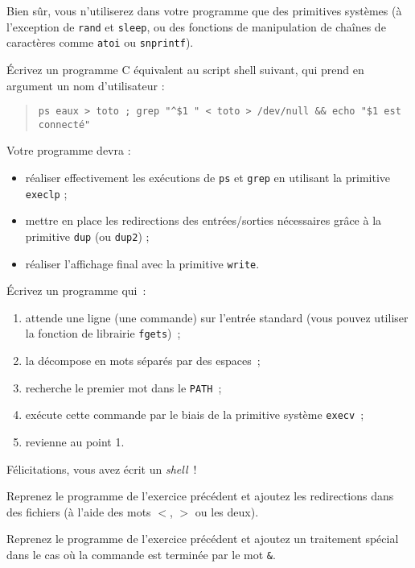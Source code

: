 Bien sûr, vous n'utiliserez dans votre programme que des primitives
systèmes (à l'exception de \texttt {rand} et \texttt {sleep}, ou des
fonctions de manipulation de chaînes de caractères comme \texttt {atoi}
ou \texttt {snprintf}).


\question

Écrivez un programme C équivalent au script shell suivant, qui prend
en argument un nom d'utilisateur :

\begin {quote}
    \verb:ps eaux > toto ; grep "^$1 " < toto > /dev/null && echo "$1 est connecté":
\end {quote}

Votre programme devra :

\begin {itemize}
    \item réaliser effectivement les exécutions de \texttt {ps} et
	\texttt {grep} en utilisant la primitive \texttt {execlp} ;

    \item mettre en place les redirections des entrées/sorties
	nécessaires grâce à la primitive \texttt {dup} (ou \texttt
	{dup2}) ;

    \item réaliser l'affichage final avec la primitive \texttt {write}.

\end {itemize}


\question

Écrivez un programme qui~:

\begin {enumerate}
    \item attende une ligne (une commande) sur l'entrée standard (vous
	pouvez utiliser la fonction de librairie {\tt fgets})~;

    \item la décompose en mots séparés par des espaces~;

    \item recherche le premier mot dans le {\tt PATH}~;

    \item exécute cette commande par le biais de la primitive système
	{\tt execv}~;
    
    \item revienne au point 1.

\end {enumerate}

Félicitations, vous avez écrit un {\em shell}~!


\question

Reprenez le programme de l'exercice précédent et ajoutez les
redirections dans des fichiers (à l'aide des mots $<$, $>$ ou les
deux).


\question
\label{q:minishell}

Reprenez le programme de l'exercice précédent et ajoutez un traitement
spécial dans le cas où la commande est terminée par le mot \verb:&:.

